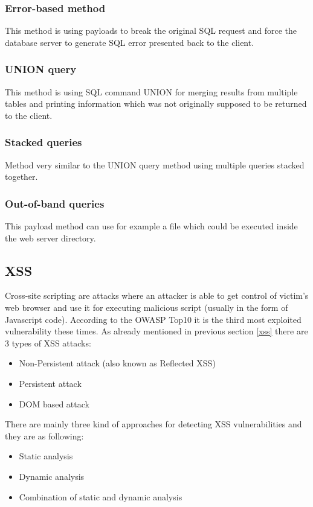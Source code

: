 			\subsubsection{Error-based method}		
			This method is using payloads to break the original SQL request and force the database server to generate SQL error presented back to the client.
		
			\subsubsection{UNION query}
			This method is using SQL command UNION for merging results from multiple tables and printing information which was not originally supposed to be returned to the client.
		
			\subsubsection{Stacked queries}
			Method very similar to the UNION query method using multiple queries stacked together.
		
			\subsubsection{Out-of-band queries}			
			This payload method can use for example a file which could be executed inside the web server directory.
		
		\subsection{XSS}		
		Cross-site scripting are attacks where an attacker is able to get control of victim's web browser and use it for executing malicious script (usually in the form of Javascript code). According to the OWASP Top10 it is the third most exploited vulnerability these times. As already mentioned in previous section \ref{xss} there are 3 types of XSS attacks:
		
		\begin{itemize}
			\item Non-Persistent attack (also known as Reflected XSS)
			\item Persistent attack
			\item DOM based attack
		\end{itemize}
		
		There are mainly three kind of approaches for detecting XSS vulnerabilities and they are as following:
		\begin{itemize}
			\item Static analysis
			\item Dynamic analysis
			\item Combination of static and dynamic analysis
		\end{itemize}
		
